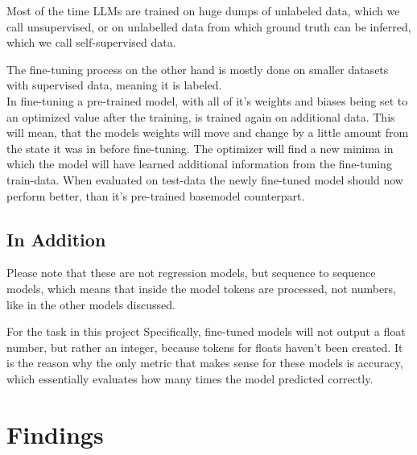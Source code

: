\documentclass{article}
\begin{document}
Most of the time LLMs are trained on huge dumps of unlabeled data, which 
we call unsupervised, or on unlabelled data from which ground truth can be 
inferred, which we call self-supervised data. 

The fine-tuning process on the other hand is mostly done on smaller datasets 
with supervised data, meaning it is labeled.
\\[2em]
In fine-tuning a pre-trained model, with all of it's weights and biases being 
set to an optimized value after the training, is trained again on additional 
data. This will mean, that the models weights will move and change by a little 
amount from the state it was in before fine-tuning. The optimizer will find a 
new minima in which the model will have learned additional information from the 
fine-tuning train-data. When evaluated on test-data the newly fine-tuned model 
should now perform better, than it's pre-trained basemodel counterpart.

\subsection{In Addition}
Please note that these are not regression models, but sequence to sequence 
models, which means that inside the model tokens are processed, not numbers, 
like in the other models discussed. 

For the task in this project Specifically, fine-tuned models will not output a 
float number, but rather an integer, because tokens for floats haven't been 
created. It is the reason why the only metric that makes sense for these models 
is accuracy, which essentially evaluates how many times the model predicted 
correctly.

\newpage

\section{Findings}
\end{document}
